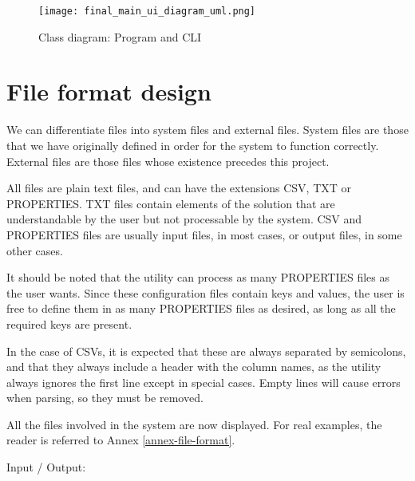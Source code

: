 \begin{figure}[H]
    \caption{Class diagram: Program and CLI}
  \centering
  \texttt{[image: final\_main\_ui\_diagram\_uml.png]}
\end{figure}


\section{File format design}

We can differentiate files into system files and external files. System files are those that we have originally defined in order for the system to function correctly. External files are those files whose existence precedes this project.

All files are plain text files, and can have the extensions CSV, TXT or PROPERTIES. TXT files contain elements of the solution that are understandable by the user but not processable by the system. CSV and PROPERTIES files are usually input files, in most cases, or output files, in some other cases.

It should be noted that the utility can process as many PROPERTIES files as the user wants. Since these configuration files contain keys and values, the user is free to define them in as many PROPERTIES files as desired, as long as all the required keys are present.

In the case of CSVs, it is expected that these are always separated by semicolons, and that they always include a header with the column names, as the utility always ignores the first line except in special cases. Empty lines will cause errors when parsing, so they must be removed.

All the files involved in the system are now displayed. For real examples, the reader is referred to Annex \ref{annex-file-format}.

Input / Output:

